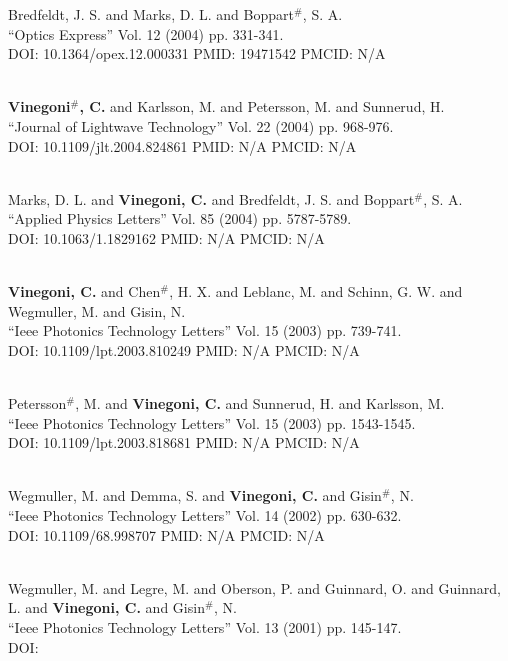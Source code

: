 Bredfeldt, J. S. and Marks, D. L. and Boppart$^\#$, S. A. \\ ``Optics Express'' Vol. 12 (2004) pp. 331-341. \\ DOI: 10.1364/opex.12.000331 PMID: 19471542 PMCID: N/A\item {} \\ {\bf Vinegoni$^\#$, C.} and Karlsson, M. and Petersson, M. and Sunnerud, H. \\ ``Journal of Lightwave Technology'' Vol. 22 (2004) pp. 968-976. \\ DOI: 10.1109/jlt.2004.824861 PMID: N/A PMCID: N/A\item {} \\ Marks, D. L. and {\bf Vinegoni, C.} and Bredfeldt, J. S. and Boppart$^\#$, S. A. \\ ``Applied Physics Letters'' Vol. 85 (2004) pp. 5787-5789. \\ DOI: 10.1063/1.1829162 PMID: N/A PMCID: N/A\item {} \\ {\bf Vinegoni, C.} and Chen$^\#$, H. X. and Leblanc, M. and Schinn, G. W. and Wegmuller, M. and Gisin, N. \\ ``Ieee Photonics Technology Letters'' Vol. 15 (2003) pp. 739-741. \\ DOI: 10.1109/lpt.2003.810249 PMID: N/A PMCID: N/A\item {} \\ Petersson$^\#$, M. and {\bf Vinegoni, C.} and Sunnerud, H. and Karlsson, M. \\ ``Ieee Photonics Technology Letters'' Vol. 15 (2003) pp. 1543-1545. \\ DOI: 10.1109/lpt.2003.818681 PMID: N/A PMCID: N/A\item {} \\ Wegmuller, M. and Demma, S. and {\bf Vinegoni, C.} and Gisin$^\#$, N. \\ ``Ieee Photonics Technology Letters'' Vol. 14 (2002) pp. 630-632. \\ DOI: 10.1109/68.998707 PMID: N/A PMCID: N/A\item {} \\ Wegmuller, M. and Legre, M. and Oberson, P. and Guinnard, O. and Guinnard, L. and {\bf Vinegoni, C.} and Gisin$^\#$, N. \\ ``Ieee Photonics Technology Letters'' Vol. 13 (2001) pp. 145-147. \\ DOI: 